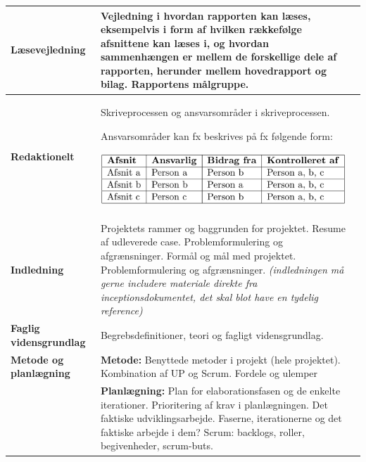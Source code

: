 \begin{longtable}{|p{30mm}|p{90mm}|p{25mm}|}
\textbf{Læsevejledning}     & Vejledning i hvordan rapporten kan læses, eksempelvis i form af hvilken rækkefølge afsnittene kan læses i, og hvordan sammenhængen er mellem de forskellige dele af rapporten, herunder mellem hovedrapport og bilag. Rapportens målgruppe.
                                &           \\ \hline

\textbf{Redaktionelt}   & Skriveprocessen og ansvarsområder i skriveprocessen.

Ansvarsområder kan fx beskrives på fx følgende form:

\includegraphics[scale=0.49]{images/kontolskema_bilag_F.png}

                                &           \\ \hline
                                
\textbf{Indledning}     & Projektets rammer og baggrunden for projektet.
Resume af udleverede case.
Problemformulering og afgrænsninger. 
Formål og mål med projektet.
Problemformulering og afgrænsninger. 
\textit{(indledningen må gerne includere materiale direkte fra inceptionsdokumentet, det skal blot have en tydelig reference)}
                                &           \\ \hline
                                
\textbf{Faglig vidensgrundlag}  & Begrebsdefinitioner, teori og  fagligt vidensgrundlag.
                                &           \\ \hline
                                
\textbf{Metode og planlægning} & \textbf{Metode:} 
Benyttede metoder i projekt (hele projektet).
Kombination af UP og Scrum. Fordele og ulemper
                                &           \\ \hline
                                
                            & \textbf{Planlægning:} 
Plan for elaborationsfasen og de enkelte iterationer. Prioritering af krav i planlægningen.
Det faktiske udviklingsarbejde. Faserne, iterationerne og det faktiske  arbejde i dem?
Scrum: backlogs, roller, begivenheder, scrum-buts.
                                &           \\ \hline


\end{longtable}
